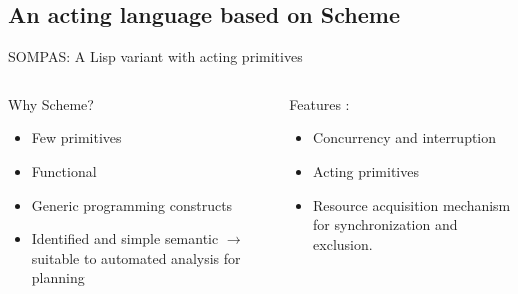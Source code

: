 \subsection{An acting language based on Scheme}
\begin{frame}{SOMPAS: A Lisp variant with acting primitives}
    
    \begin{columns}
        \begin{column}{0.5\textwidth}
            Why Scheme?
            \begin{itemize}
                \item Few primitives
                \item Functional
                \item Generic programming constructs
                \item Identified and simple semantic $\rightarrow$ suitable to automated analysis for planning
            \end{itemize}
        \end{column}
        \begin{column}{0.5\textwidth}
            Features :
            \begin{itemize}
                \item Concurrency and interruption
                \item Acting primitives
                \item Resource acquisition mechanism for synchronization and exclusion.
            \end{itemize}

        \end{column}
    \end{columns}
\end{frame}

